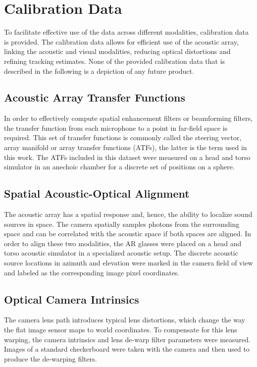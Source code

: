 \documentclass[journal]{IEEEtran}
\begin{document}
\section{Calibration Data} \label{appx:CalibrationData}
To facilitate effective use of the data across different modalities, calibration data is provided.
The calibration data allows for efficient use of the acoustic array, linking the acoustic and visual modalities, reducing optical distortions and refining tracking estimates.
None of the provided calibration data that is described in the following is a depiction of any future product.

\subsection{Acoustic Array Transfer Functions}
In order to effectively compute spatial enhancement filters or beamforming filters, the transfer function from each microphone to a point in far-field space is required.
This set of transfer functions is commonly called the steering vector, array manifold or array transfer functions (ATFs), the latter is the term used in this work.
The ATFs included in this dataset were measured on a head and torso simulator in an anechoic chamber for a discrete set of positions on a sphere.


\subsection{Spatial Acoustic-Optical Alignment}
The acoustic array has a spatial response and, hence, the ability to localize sound sources in space.
The camera spatially samples photons from the surrounding space and can be correlated with the acoustic space if both spaces are aligned.
In order to align these two modalities, the AR glasses were placed on a head and torso acoustic simulator in a specialized acoustic setup.
The discrete acoustic source locations in azimuth and elevation were marked in the camera field of view and labeled as the corresponding image pixel coordinates.



\subsection{Optical Camera Intrinsics}
The camera lens path introduces typical lens distortions, which change the way the flat image sensor maps to world coordinates.
To compensate for this lens warping, the camera intrinsics and lens de-warp filter parameters were measured.
Images of a standard checkerboard were taken with the camera and then used to produce the de-warping filters.
\end{document}
